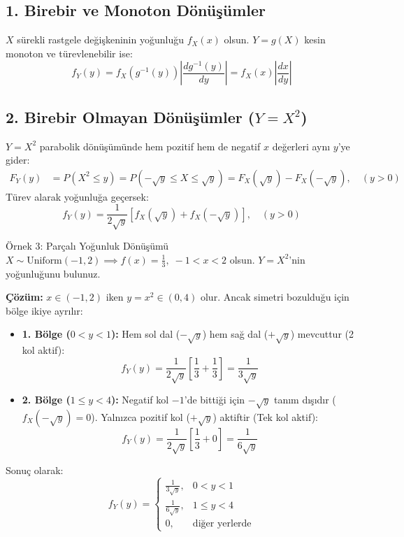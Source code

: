 \documentclass[12pt,a4paper]{article}
\begin{document}
\subsection{1. Birebir ve Monoton Dönüşümler}
$X$ sürekli rastgele değişkeninin yoğunluğu $f_X(x)$ olsun. $Y = g(X)$ kesin monoton ve türevlenebilir ise:
\begin{equation}
    \boxed{f_Y(y) = f_X(g^{-1}(y)) \left| \frac{d g^{-1}(y)}{dy} \right| = f_X(x) \left| \frac{dx}{dy} \right|}
\end{equation}

\subsection{2. Birebir Olmayan Dönüşümler (\texorpdfstring{$Y = X^2$}{Y = X^2})}
$Y = X^2$ parabolik dönüşümünde hem pozitif hem de negatif $x$ değerleri aynı $y$'ye gider:
\begin{align}
    F_Y(y) &= P(X^2 \le y) = P(-\sqrt{y} \le X \le \sqrt{y}) = F_X(\sqrt{y}) - F_X(-\sqrt{y}), \quad (y > 0)
\end{align}
Türev alarak yoğunluğa geçersek:
\begin{equation}
    \boxed{f_Y(y) = \frac{1}{2\sqrt{y}} \left[ f_X(\sqrt{y}) + f_X(-\sqrt{y}) \right], \quad (y > 0)}
\end{equation}

\begin{ornek}{Örnek 3: Parçalı Yoğunluk Dönüşümü}
$X \sim \text{Uniform}(-1, 2) \implies f(x) = \frac{1}{3}, \; -1 < x < 2$ olsun. $Y = X^2$'nin yoğunluğunu bulunuz.

\bigskip
\textbf{Çözüm:}
$x \in (-1, 2)$ iken $y = x^2 \in (0, 4)$ olur. Ancak simetri bozulduğu için bölge ikiye ayrılır:
\begin{itemize}
    \item \textbf{1. Bölge ($0 < y < 1$):} Hem sol dal ($-\sqrt{y}$) hem sağ dal ($+\sqrt{y}$) mevcuttur (2 kol aktif):
    \begin{equation}
        f_Y(y) = \frac{1}{2\sqrt{y}} \left[ \frac{1}{3} + \frac{1}{3} \right] = \boxed{\frac{1}{3\sqrt{y}}}
    \end{equation}
    \item \textbf{2. Bölge ($1 \le y < 4$):} Negatif kol $-1$'de bittiği için $-\sqrt{y}$ tanım dışıdır ($f_X(-\sqrt{y})=0$). Yalnızca pozitif kol ($+\sqrt{y}$) aktiftir (Tek kol aktif):
    \begin{equation}
        f_Y(y) = \frac{1}{2\sqrt{y}} \left[ \frac{1}{3} + 0 \right] = \boxed{\frac{1}{6\sqrt{y}}}
    \end{equation}
\end{itemize}
Sonuç olarak:
\begin{equation}
    f_Y(y) = 
    \begin{cases}
        \frac{1}{3\sqrt{y}}, & 0 < y < 1 \\
        \frac{1}{6\sqrt{y}}, & 1 \le y < 4 \\
        0, & \text{diğer yerlerde}
    \end{cases}
\end{equation}
\end{ornek}
\end{document}
